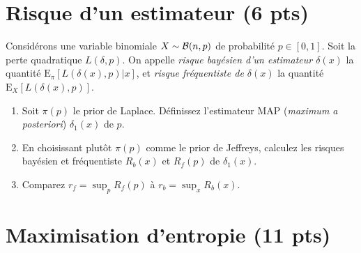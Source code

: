 \documentclass[10pt]{article}
\newcommand{\E}{\mbox{E}}
\newcommand{\1}{\mathbbm{1}}
\begin{document}
\section{Risque d'un estimateur (6 pts)}

Considérons une variable binomiale $X\sim{\cal{B}}(n,p)$ de probabilité $p\in[0,1]$. Soit la perte quadratique $L(\delta,p)$. On appelle {\it risque bayésien d'un estimateur $\delta(x)$} la quantité $\E_{\pi}[L(\delta(x),p)|x]$, et  {\it risque fréquentiste de $\delta(x)$}  la quantité $\E_{X}[L(\delta(x),p)]$.
\begin{enumerate}
\item Soit $\pi(p)$ le prior de Laplace. Définissez l'estimateur MAP ({\it maximum a posteriori}) $\delta_1(x)$ de $p$.
\item En choisissant plutôt $\pi(p)$ comme le prior de Jeffreys, calculez les risques bayésien et fréquentiste $R_b(x)$ et $R_f(p)$ de  $\delta_1(x)$.
\item Comparez $r_f = \sup_p R_f(p)$ à 
$r_b  =  \sup_x R_b(x)$. 
\end{enumerate}


\section{Maximisation d'entropie (11 pts) }\label{max.entropie}
\end{document}
